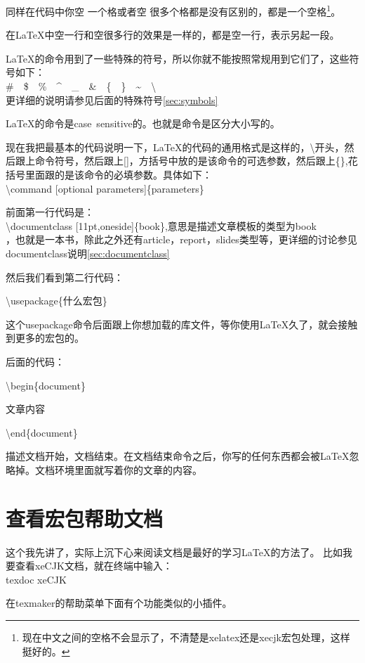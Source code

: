 \documentclass[11pt,oneside]{book}
\begin{document}
  同样在代码中你空 一个格或者空      很多个格都是没有区别的，都是一个空格\footnote{现在中文之间的空格不会显示了，不清楚是xelatex还是xecjk宏包处理，这样挺好的。}。

  在\LaTeX 中空一行和空很多行的效果是一样的，都是空一行，表示另起一段。

  \LaTeX 的命令用到了一些特殊的符号，所以你就不能按照常规用到它们了，这些符号如下：\\
  \#~~\$~~\%~~\^~~\_~~\&~~\{~~\}~~\~~~\textbackslash \\
  更详细的说明请参见后面的特殊符号\ref{sec:symbols}

  \LaTeX 的命令是case~sensitive的。也就是命令是区分大小写的。

  现在我把最基本的代码说明一下，\LaTeX 的代码的通用格式是这样的，\textbackslash{}开头，然后跟上命令符号，然后跟上[]，方括号中放的是该命令的可选参数，然后跟上\{\},花括号里面跟的是该命令的必填参数。具体如下：\\
  \textbackslash command [optional parameters]\{parameters\}

  前面第一行代码是：\\
  \textbackslash documentclass [11pt,oneside]\{book\},意思是描述文章模板的类型为book\\，也就是一本书，除此之外还有article，report，slides类型等，更详细的讨论参见documentclass说明\ref{sec:documentclass}

  然后我们看到第二行代码：

  \textbackslash usepackage\{什么宏包\}

  这个usepackage命令后面跟上你想加载的库文件，等你使用\LaTeX 久了，就会接触到更多的宏包的。

  后面的代码：

  \textbackslash begin\{document\}

  文章内容

  \textbackslash end\{document\}

  描述文档开始，文档结束。在文档结束命令之后，你写的任何东西都会被\LaTeX 忽略掉。文档环境里面就写着你的文章的内容。

  \section{查看宏包帮助文档}
  这个我先讲了，实际上沉下心来阅读文档是最好的学习\LaTeX 的方法了。
  比如我要查看xeCJK文档，就在终端中输入：\\
  texdoc xeCJK

  在texmaker的帮助菜单下面有个功能类似的小插件。
\end{document}
